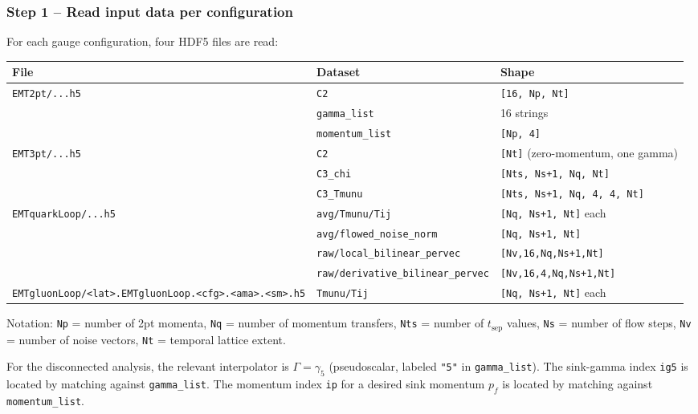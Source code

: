 \documentclass[11pt,a4paper]{article}
\newcommand{\code}[1]{\texttt{#1}}
\begin{document}
\subsubsection{Step 1 -- Read input data per configuration}
\label{sec:analysis_step1}

For each gauge configuration, four HDF5 files are read:

\begin{center}
\begin{tabular}{@{}lll@{}}
\toprule
\textbf{File} & \textbf{Dataset} & \textbf{Shape} \\
\midrule
\code{EMT2pt/...h5}   & \code{C2}          & \code{[16, Np, Nt]} \\
                       & \code{gamma\_list} & 16 strings \\
                       & \code{momentum\_list} & \code{[Np, 4]} \\
\midrule
\code{EMT3pt/...h5}   & \code{C2}          & \code{[Nt]} (zero-momentum, one gamma) \\
                       & \code{C3\_chi}     & \code{[Nts, Ns+1, Nq, Nt]} \\
                       & \code{C3\_Tmunu}   & \code{[Nts, Ns+1, Nq, 4, 4, Nt]} \\
\midrule
\code{EMTquarkLoop/...h5}     & \code{avg/Tmunu/Tij} & \code{[Nq, Ns+1, Nt]} each \\
                       & \code{avg/flowed\_noise\_norm} & \code{[Nq, Ns+1, Nt]} \\
                       & \code{raw/local\_bilinear\_pervec} & \code{[Nv,16,Nq,Ns+1,Nt]} \\
                       & \code{raw/derivative\_bilinear\_pervec} & \code{[Nv,16,4,Nq,Ns+1,Nt]} \\
\midrule
\code{EMTgluonLoop/<lat>.EMTgluonLoop.<cfg>.<ama>.<sm>.h5} & \code{Tmunu/Tij} & \code{[Nq, Ns+1, Nt]} each \\
\bottomrule
\end{tabular}
\end{center}

Notation: \code{Np} = number of 2pt momenta, \code{Nq} = number of momentum transfers,
\code{Nts} = number of $t_{\text{sep}}$ values, \code{Ns} = number of flow steps,
\code{Nv} = number of noise vectors, \code{Nt} = temporal lattice extent.

For the disconnected analysis, the relevant interpolator is $\Gamma = \gamma_5$ (pseudoscalar, labeled \code{"5"} in \code{gamma\_list}).
The sink-gamma index \code{ig5} is located by matching against \code{gamma\_list}.
The momentum index \code{ip} for a desired sink momentum $p_f$ is located by matching against \code{momentum\_list}.
\end{document}
